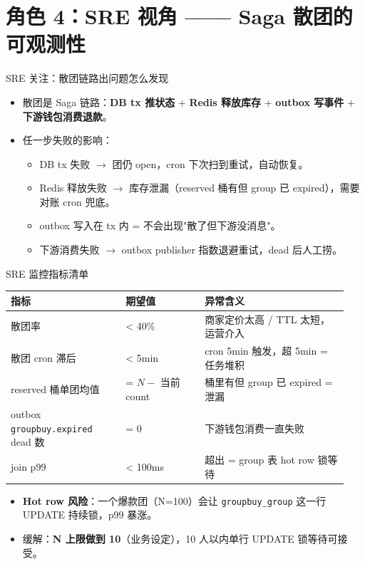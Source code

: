 \documentclass[aspectratio=169,11pt]{beamer}
\begin{document}
\section{角色 4：SRE 视角 —— Saga 散团的可观测性}

\begin{frame}[shrink]{SRE 关注：散团链路出问题怎么发现}
\begin{itemize}
  \item 散团是 Saga 链路：\textbf{DB tx 推状态} + \textbf{Redis 释放库存} + \textbf{outbox 写事件} + \textbf{下游钱包消费退款}。
  \item 任一步失败的影响：
  \begin{itemize}
    \item DB tx 失败 $\to$ 团仍 open，cron 下次扫到重试，自动恢复。
    \item Redis 释放失败 $\to$ 库存泄漏（reserved 桶有但 group 已 expired），需要对账 cron 兜底。
    \item outbox 写入在 tx 内 = 不会出现"散了但下游没消息"。
    \item 下游消费失败 $\to$ outbox publisher 指数退避重试，dead 后人工捞。
  \end{itemize}
\end{itemize}
\end{frame}

\begin{frame}[shrink]{SRE 监控指标清单}
\footnotesize
\begin{tabular}{@{}p{0.32\linewidth}p{0.22\linewidth}p{0.40\linewidth}@{}}
\toprule
指标 & 期望值 & 异常含义 \\
\midrule
散团率 & < 40\% & 商家定价太高 / TTL 太短，运营介入 \\
散团 cron 滞后 & < 5min & cron 5min 触发，超 5min = 任务堆积 \\
reserved 桶单团均值 & = $N - $ 当前 count & 桶里有但 group 已 expired = 泄漏 \\
outbox \texttt{groupbuy.expired} dead 数 & = 0 & 下游钱包消费一直失败 \\
join p99 & < 100ms & 超出 = group 表 hot row 锁等待 \\
\bottomrule
\end{tabular}
\normalsize
\vspace{2mm}
\begin{itemize}
  \item \textbf{Hot row 风险}：一个爆款团（N=100）会让 \texttt{groupbuy\_group} 这一行 UPDATE 持续锁，p99 暴涨。
  \item 缓解：\textbf{N 上限做到 10}（业务设定），10 人以内单行 UPDATE 锁等待可接受。
\end{itemize}
\end{frame}
\end{document}
